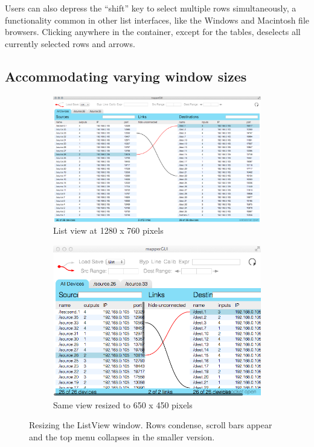Users can also depress the ``shift'' key to select multiple rows simultaneously, a functionality common in other list interfaces, like the Windows and Macintosh file browsers. Clicking anywhere in the container, except for the tables, deselects all currently selected rows and arrows.
	

	\subsection{Accommodating varying window sizes} %
	\label{sec:accomodating_sizes}

\begin{figure}
	\centering
	\begin{subfigure}[]{\textwidth}
		\centering
		\includegraphics[width=\textwidth]{figures/before_resize_1280x760}
		\caption{List view at 1280 x 760 pixels}
		\label{fig:before_resize}
	\end{subfigure}
	\begin{subfigure}[]{0.5\textwidth}
		\centering
		\includegraphics[width=\textwidth]{figures/after_resize_650x450}
		\caption{Same view resized to 650 x 450 pixels}
		\label{fig:after_resize}
	\end{subfigure}
	\caption{Resizing the ListView window. Rows condense, scroll bars appear and the top menu collapses in the smaller version.}\label{fig:resizing}
\end{figure}

